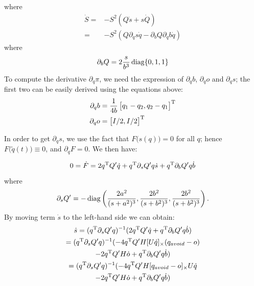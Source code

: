 \documentclass[10pt,twocolumn,twoside]{IEEEtran}
\begin{document}
    where
    \begin{equation}\label{equ:S_dot}
      \begin{split}
        \dot S  =& - S^2 (Q \dot s + s \dot Q)\\
        =& - S^2 (Q \partial_q s \dot q - \partial_b Q \partial_q b \dot q)
      \end{split}
    \end{equation}
    where
    \begin{equation}
      \partial_b Q = 2\frac{s}{b^3} \operatorname{diag}\{0,1,1\}
    \end{equation}
    To compute the derivative $\partial_q \pi$, we need the expression of $\partial_q b$, $\partial_q o$ and $\partial_q s$; the first two can be easily derived using the equations above:
    \begin{align}
      \partial_q b &= \frac{1}{4b}\begin{bmatrix}q_1-q_2,q_2-q_1\end{bmatrix}^\mathrm{T}\\
      \partial_q o &= \begin{bmatrix}I/2,I/2\end{bmatrix}^\mathrm{T}
    \end{align}

    In order to get $\partial_q s$, we use the fact that $F\bigl(s(q)\bigr)=0$ for all $q$; hence $F\bigl(\tilde{q}(t)\bigr)\equiv 0$, and $\partial_q F = 0$. We then have:

    \begin{equation}
      0=\dot F =  2q^\mathrm{T} Q' \dot q + q^\mathrm{T} \partial_s Q' q \dot s + q^\mathrm{T} \partial_bQ' q \dot b
    \end{equation}
    where
    \begin{equation}
      \partial_s Q'= -\operatorname{diag}\left(\frac{2a^2}{(s+a^2)^3},\frac{2b^2}{(s+b^2)^3},\frac{2b^2}{(s+b^2)^3}\right).
    \end{equation}
    By moving term $\dot s$ to the left-hand side we can obtain:
    \begin{multline}\label{equ:s_dot}
      \dot s =  (q^\mathrm{T} \partial_s Q' q)^{-1} (2q^\mathrm{T} Q' \dot q + q^\mathrm{T} \partial_b Q' q \dot b)\\
      =  (q^\mathrm{T} \partial_s Q' q)^{-1} (-4q^\mathrm{T} Q' H[U\dot q]_\times (q_{avoid} - o) \\
      -2q^\mathrm{T} Q'H\dot o + q^\mathrm{T} \partial_b Q' q \dot b)\\
      =  (q^\mathrm{T} \partial_s Q' q)^{-1} (-4q^\mathrm{T} Q' H[q_{avoid} - o]_\times U\dot q \\
      -2q^\mathrm{T} Q'H\dot o + q^\mathrm{T} \partial_b Q' q \dot b)
    \end{multline}
\end{document}
